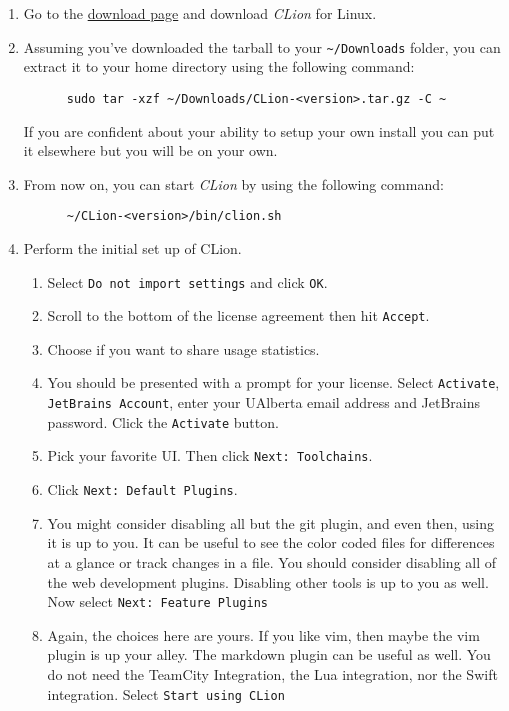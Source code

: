 \documentclass[../setup.tex]{subfiles}
\begin{document}
\begin{enumerate}
  \item
    Go to the \href{https://www.jetbrains.com/clion/download/\#section=linux} {download page} and
    download \textit{CLion} for Linux.
  \item
    Assuming you've downloaded the tarball to your \lstinline{~/Downloads} folder, you can extract
    it to your home directory using the following command:
    \begin{lstlisting}
      sudo tar -xzf ~/Downloads/CLion-<version>.tar.gz -C ~
    \end{lstlisting}
    If you are confident about your ability to setup your own install you can put it
    elsewhere but you will be on your own.
  \item
    From now on, you can start \textit{CLion} by using the following command:
    \begin{lstlisting}
      ~/CLion-<version>/bin/clion.sh
    \end{lstlisting}
  \item
    Perform the initial set up of CLion.
    \begin{enumerate}
      \item
        Select \texttt{Do not import settings} and click \texttt{OK}.
      \item
        Scroll to the bottom of the license agreement then hit \texttt{Accept}.
      \item
        Choose if you want to share usage statistics.
      \item
        You should be presented with a prompt for your license. Select \texttt{Activate},
        \texttt{JetBrains Account}, enter your UAlberta email address and JetBrains password.
        Click the \texttt{Activate} button.
      \item
        Pick your favorite UI. Then click \texttt{Next: Toolchains}.
      \item
        Click \texttt{Next: Default Plugins}.
      \item
        You might consider disabling all but the git plugin, and even then, using it is up to you.
        It can be useful to see the color coded files for differences at a glance or track changes
        in a file. You should consider disabling all of the web development plugins. Disabling
        other tools is up to you as well. Now select \texttt{Next: Feature Plugins}
      \item
        Again, the choices here are yours. If you like vim, then maybe the vim plugin is up your
        alley. The markdown plugin can be useful as well. You do not need the TeamCity Integration,
        the Lua integration, nor the Swift integration. Select \texttt{Start using CLion}
    \end{enumerate}
\end{enumerate}
\end{document}

